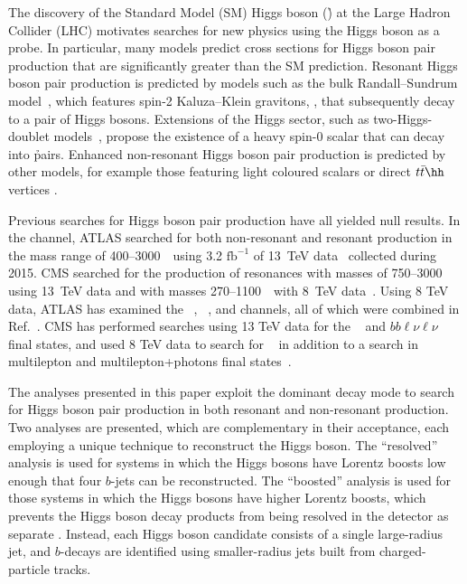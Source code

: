 The discovery of the Standard Model (SM) Higgs boson (\h) \cite{Aad:2012tfa,Chatrchyan201230} at the Large Hadron Collider (LHC) motivates searches for new physics using the Higgs boson as a probe. In particular, many models predict cross sections for Higgs boson pair production that are significantly greater than the SM prediction. Resonant Higgs boson pair production is predicted by models such as the bulk Randall--Sundrum model~\cite{Agashe:2007zd,Fitzpatrick}, which features spin-2 Kaluza--Klein gravitons, \Grav, that subsequently decay to a pair of Higgs bosons. Extensions of the Higgs sector, such as two-Higgs-doublet models~\cite{PhysRevD.8.1226, Branco:2011iw}, propose the existence of a heavy spin-0 scalar that can decay into \h pairs. Enhanced non-resonant Higgs boson pair production is predicted by other models, for example those featuring light coloured scalars \cite{PhysRevD.86.095023} or direct $t\bar{t}\hh$ vertices \cite{Grober:2010yv,Contino:2012xk}.

Previous searches for Higgs boson pair production have all yielded null results. In the \bbbb channel, ATLAS searched for both non-resonant and resonant production in the mass range of 400--3000~\GeV\ using 3.2 $\mathrm{fb}^{-1}$ of 13~TeV data~\cite{EXOT-2015-11} collected during 2015. CMS searched for the production of resonances with masses of 750--3000~\GeV~\cite{CMS-B2G-16-026} using 13~TeV data and with masses 270--1100~\GeV\ with 8~TeV data~\cite{CMS-HIG-14-013}. Using 8 TeV data, ATLAS has examined the \bbbb~\cite{Aad:2015uka}, \bbgg~\cite{HIGG-2013-29}, \bbtautau and \WWgg channels, all of which were combined in Ref.~\cite{HIGG-2013-33}. CMS has performed searches using 13 TeV data for the  \bbtautau~\cite{CMS-HIG-17-002} and $bb\ell\nu\ell\nu$~\cite{CMSHIG17006} final states, and used 8 TeV data to search for \bbgg~\cite{Khachatryan:2016sey} in addition to a search in multilepton and multilepton+photons final states~\cite{Khachatryan:2014jya}.

The analyses presented in this paper exploit the dominant \hbb decay mode to search for Higgs boson pair production in both resonant and non-resonant production. Two analyses are presented, which are complementary in their acceptance, each employing a unique technique to reconstruct the Higgs boson. The ``resolved'' analysis is used for \hh systems in which the Higgs bosons have Lorentz boosts low enough that four $b$-jets can be reconstructed. The ``boosted'' analysis is used for those \hh systems in which the Higgs bosons have higher Lorentz boosts, which prevents the Higgs boson decay products from being resolved in the detector as separate \bjets. Instead, each Higgs boson candidate consists of a single large-radius jet, and $b$-decays are identified using smaller-radius jets built from charged-particle tracks.

